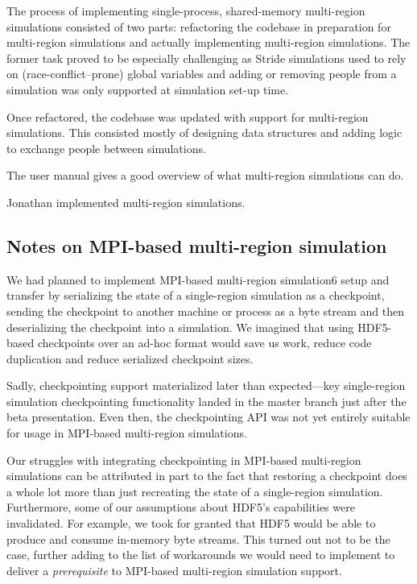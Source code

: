 \documentclass[a4paper,12pt]{article}
\begin{document}
The process of implementing single-process, shared-memory multi-region simulations consisted of two parts: refactoring the codebase in preparation for multi-region simulations and actually implementing multi-region simulations. The former task proved to be especially challenging as Stride simulations used to rely on (race-conflict--prone) global variables and adding or removing people from a simulation was only supported at simulation set-up time.

Once refactored, the codebase was updated with support for multi-region simulations. This consisted mostly of designing data structures and adding logic to exchange people between simulations.

The user manual gives a good overview of what multi-region simulations can do.

Jonathan implemented multi-region simulations.

\subsection{Notes on MPI-based multi-region simulation}

We had planned to implement MPI-based multi-region simulation6 setup and transfer by serializing the state of a single-region simulation as a checkpoint, sending the checkpoint to another machine or process as a byte stream and then deserializing the checkpoint into a simulation. We imagined that using HDF5-based checkpoints over an ad-hoc format would save us work, reduce code duplication and reduce serialized checkpoint sizes.

Sadly, checkpointing support materialized later than expected---key single-region simulation checkpointing functionality landed in the master branch just after the beta presentation. Even then, the checkpointing API was not yet entirely suitable for usage in MPI-based multi-region simulations.

Our struggles with integrating checkpointing in MPI-based multi-region simulations can be attributed in part to the fact that restoring a checkpoint does a whole lot more than just recreating the state of a single-region simulation. Furthermore, some of our assumptions about HDF5's capabilities were invalidated. For example, we took for granted that HDF5 would be able to produce and consume in-memory byte streams. This turned out not to be the case, further adding to the list of workarounds we would need to implement to deliver a \emph{prerequisite} to MPI-based multi-region simulation support.
\end{document}
